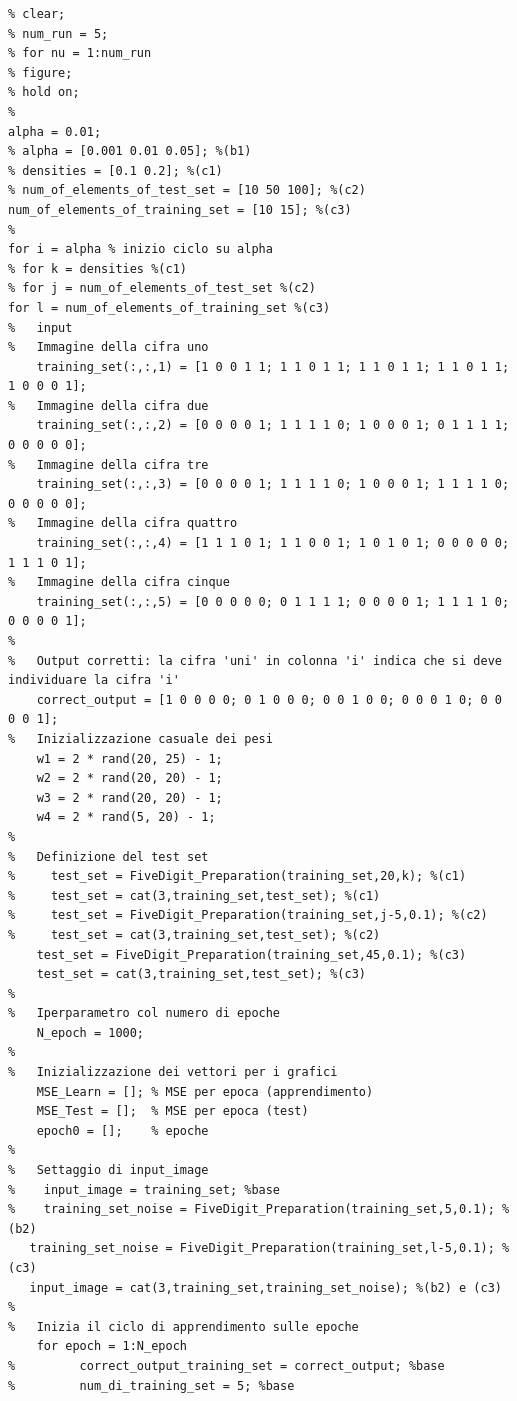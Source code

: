 \documentclass[a4paper,12pt]{article}
\begin{document}
\begin{lstlisting}[style=Matlab-editor,caption=\texttt{FiveDigit\_Training},title=\texttt{FiveDigit\_Training.mat},label=lst:training]
% % Produci un grafico ad ogni run ###
% clear;
% num_run = 5;
% for nu = 1:num_run
% figure;
% hold on;
%
alpha = 0.01;
% alpha = [0.001 0.01 0.05]; %(b1)
% densities = [0.1 0.2]; %(c1)
% num_of_elements_of_test_set = [10 50 100]; %(c2)
num_of_elements_of_training_set = [10 15]; %(c3)
%
for i = alpha % inizio ciclo su alpha
% for k = densities %(c1)
% for j = num_of_elements_of_test_set %(c2)
for l = num_of_elements_of_training_set %(c3)
%   input
%   Immagine della cifra uno
    training_set(:,:,1) = [1 0 0 1 1; 1 1 0 1 1; 1 1 0 1 1; 1 1 0 1 1; 1 0 0 0 1];
%   Immagine della cifra due
    training_set(:,:,2) = [0 0 0 0 1; 1 1 1 1 0; 1 0 0 0 1; 0 1 1 1 1; 0 0 0 0 0];
%   Immagine della cifra tre
    training_set(:,:,3) = [0 0 0 0 1; 1 1 1 1 0; 1 0 0 0 1; 1 1 1 1 0; 0 0 0 0 0];
%   Immagine della cifra quattro
    training_set(:,:,4) = [1 1 1 0 1; 1 1 0 0 1; 1 0 1 0 1; 0 0 0 0 0; 1 1 1 0 1];
%   Immagine della cifra cinque
    training_set(:,:,5) = [0 0 0 0 0; 0 1 1 1 1; 0 0 0 0 1; 1 1 1 1 0; 0 0 0 0 1];
%
%   Output corretti: la cifra 'uni' in colonna 'i' indica che si deve individuare la cifra 'i'
    correct_output = [1 0 0 0 0; 0 1 0 0 0; 0 0 1 0 0; 0 0 0 1 0; 0 0 0 0 1];
%   Inizializzazione casuale dei pesi
    w1 = 2 * rand(20, 25) - 1;
    w2 = 2 * rand(20, 20) - 1; 
    w3 = 2 * rand(20, 20) - 1;
    w4 = 2 * rand(5, 20) - 1;
%
%   Definizione del test set
%     test_set = FiveDigit_Preparation(training_set,20,k); %(c1)
%     test_set = cat(3,training_set,test_set); %(c1)
%     test_set = FiveDigit_Preparation(training_set,j-5,0.1); %(c2)
%     test_set = cat(3,training_set,test_set); %(c2)
    test_set = FiveDigit_Preparation(training_set,45,0.1); %(c3)
    test_set = cat(3,training_set,test_set); %(c3)
%
%   Iperparametro col numero di epoche
    N_epoch = 1000;
%
%   Inizializzazione dei vettori per i grafici
    MSE_Learn = []; % MSE per epoca (apprendimento)
    MSE_Test = [];  % MSE per epoca (test)
    epoch0 = [];    % epoche
%
%   Settaggio di input_image
%    input_image = training_set; %base
%    training_set_noise = FiveDigit_Preparation(training_set,5,0.1); %(b2)
   training_set_noise = FiveDigit_Preparation(training_set,l-5,0.1); %(c3)
   input_image = cat(3,training_set,training_set_noise); %(b2) e (c3)
%
%   Inizia il ciclo di apprendimento sulle epoche
    for epoch = 1:N_epoch
%         correct_output_training_set = correct_output; %base
%         num_di_training_set = 5; %base

\end{lstlisting}
\end{document}
